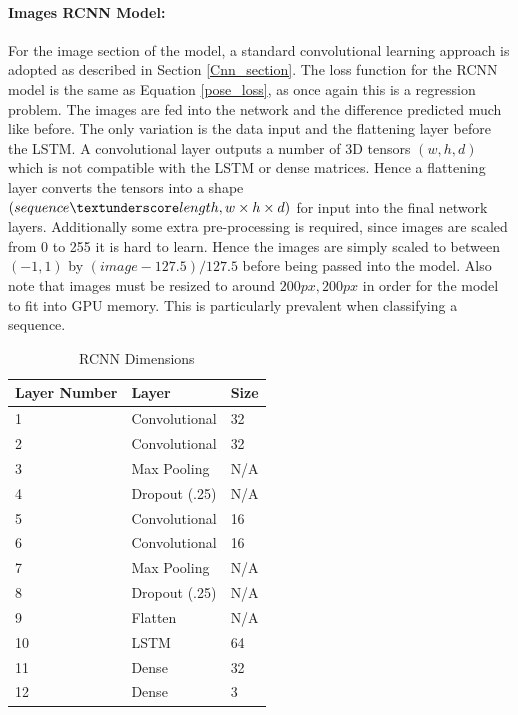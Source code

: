 \documentclass[11pt,twoside]{report}
\begin{document}
\paragraph{Images RCNN Model:} \label{images_rcnn}
For the image section of the model, a standard convolutional learning approach is adopted as described in Section \ref{Cnn_section}. The loss function for the RCNN model is the same as Equation \ref{pose_loss}, as once again this is a regression problem. The images are fed into the network and the difference predicted much like before. The only variation is the data input and the flattening layer before the LSTM. A convolutional layer outputs a number of 3D tensors $(w,h,d)$ which is not compatible with the LSTM or dense matrices. Hence a flattening layer converts the tensors into a shape $(sequence \textunderscore length, w \times h \times d)$ for input into the final network layers. Additionally some extra pre-processing is required, since images are scaled from 0 to 255 it is hard to learn. Hence the images are simply scaled to between $(-1,1)$ by $(image-127.5)/127.5$ before being passed into the model. Also note that images must be resized to around $200px,200px$ in order for the model to fit into GPU memory. This is particularly prevalent when classifying a sequence.

\noindent \begin{table}[h!]
	\centering
	\begin{tabular}{|p{3.5cm}|p{3.5cm}|p{3.5cm}|}
		\hline
		\textbf{Layer Number}&\textbf{Layer} & \textbf{Size}                                  \\ \hline
		1  & Convolutional   &   32     \\ \hline
		2  & Convolutional   &   32     \\ \hline
		3  & Max Pooling     &   N/A    \\ \hline
		4  & Dropout (.25)   &   N/A    \\ \hline
		5  & Convolutional   &   16     \\ \hline
		6  & Convolutional   &   16     \\ \hline
		7  & Max Pooling     &   N/A    \\ \hline  
		8  & Dropout (.25)   &   N/A    \\ \hline
		9  & Flatten         &   N/A    \\ \hline
		10 & LSTM            &   64     \\ \hline   
		11 & Dense           &   32     \\ \hline 
		12 & Dense           &   3      \\ \hline 
		                                                                           
	\end{tabular}
\caption{RCNN Dimensions}
\end{table}
\end{document}
